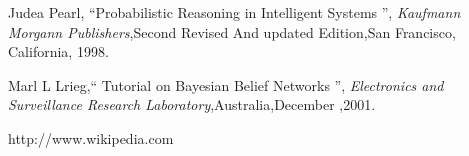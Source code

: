 \begin{thebibliography}{1}
Judea Pearl, ``Probabilistic Reasoning in Intelligent Systems '', \emph{Kaufmann Morgann Publishers},Second Revised And updated Edition,San Francisco, California, 1998.

Marl L Lrieg,`` Tutorial on Bayesian Belief Networks '', \emph{Electronics and Surveillance Research Laboratory},Australia,December ,2001.

http://www.wikipedia.com








\end{thebibliography} 